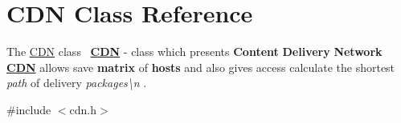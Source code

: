 \hypertarget{class_c_d_n}{}\section{C\+DN Class Reference}
\label{class_c_d_n}


The \mbox{\hyperlink{class_c_d_n}{C\+DN}} class~\newline
{\bfseries{\mbox{\hyperlink{class_c_d_n}{C\+DN}}}} -\/ class which presents {\bfseries{Content}} {\bfseries{Delivery}} {\bfseries{Network}} ~\newline
{\bfseries{\mbox{\hyperlink{class_c_d_n}{C\+DN}}}} allows save {\bfseries{matrix}} of {\bfseries{hosts}} and also gives access calculate the shortest {\itshape path} of delivery {\itshape packages\textbackslash{}n} .  




{\ttfamily \#include $<$cdn.\+h$>$}

